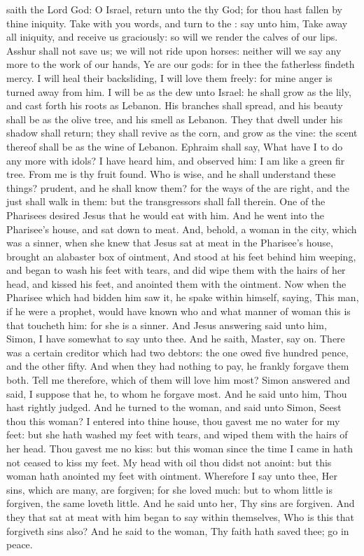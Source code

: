  saith the Lord God: O Israel, return unto the  thy God; for thou hast fallen by thine iniquity. Take with you words, and turn to the : say unto him, Take away all iniquity, and receive us graciously: so will we render the calves of our lips. Asshur shall not save us; we will not ride upon horses: neither will we say any more to the work of our hands, Ye are our gods: for in thee the fatherless findeth mercy. I will heal their backsliding, I will love them freely: for mine anger is turned away from him. I will be as the dew unto Israel: he shall grow as the lily, and cast forth his roots as Lebanon. His branches shall spread, and his beauty shall be as the olive tree, and his smell as Lebanon. They that dwell under his shadow shall return; they shall revive as the corn, and grow as the vine: the scent thereof shall be as the wine of Lebanon. Ephraim shall say, What have I to do any more with idols? I have heard him, and observed him: I am like a green fir tree. From me is thy fruit found. Who is wise, and he shall understand these things? prudent, and he shall know them? for the ways of the  are right, and the just shall walk in them: but the transgressors shall fall therein.
 One of the Pharisees desired Jesus that he would eat with him. And he went into the Pharisee's house, and sat down to meat. And, behold, a woman in the city, which was a sinner, when she knew that Jesus sat at meat in the Pharisee's house, brought an alabaster box of ointment, And stood at his feet behind him weeping, and began to wash his feet with tears, and did wipe them with the hairs of her head, and kissed his feet, and anointed them with the ointment. Now when the Pharisee which had bidden him saw it, he spake within himself, saying, This man, if he were a prophet, would have known who and what manner of woman this is that toucheth him: for she is a sinner. And Jesus answering said unto him, Simon, I have somewhat to say unto thee. And he saith, Master, say on. There was a certain creditor which had two debtors: the one owed five hundred pence, and the other fifty. And when they had nothing to pay, he frankly forgave them both. Tell me therefore, which of them will love him most? Simon answered and said, I suppose that he, to whom he forgave most. And he said unto him, Thou hast rightly judged. And he turned to the woman, and said unto Simon, Seest thou this woman? I entered into thine house, thou gavest me no water for my feet: but she hath washed my feet with tears, and wiped them with the hairs of her head. Thou gavest me no kiss: but this woman since the time I came in hath not ceased to kiss my feet. My head with oil thou didst not anoint: but this woman hath anointed my feet with ointment. Wherefore I say unto thee, Her sins, which are many, are forgiven; for she loved much: but to whom little is forgiven, the same loveth little. And he said unto her, Thy sins are forgiven. And they that sat at meat with him began to say within themselves, Who is this that forgiveth sins also? And he said to the woman, Thy faith hath saved thee; go in peace.
